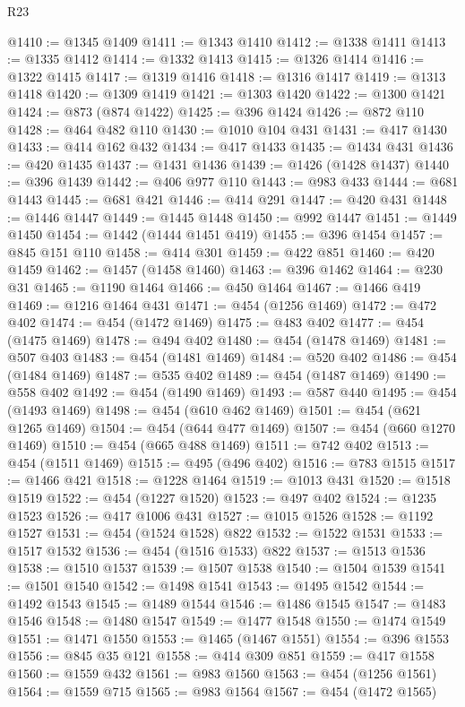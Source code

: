 \begin{lexlean}{R23}
\begin{coremodule}
@1410 := @1345 @1409
@1411 := @1343 @1410
@1412 := @1338 @1411
@1413 := @1335 @1412
@1414 := @1332 @1413
@1415 := @1326 @1414
@1416 := @1322 @1415
@1417 := @1319 @1416
@1418 := @1316 @1417
@1419 := @1313 @1418
@1420 := @1309 @1419
@1421 := @1303 @1420
@1422 := @1300 @1421
@1424 := @873 (@874 @1422)
@1425 := @396 @1424
@1426 := @872 @110
@1428 := @464 @482 @110
@1430 := @1010 @104 @431
@1431 := @417 @1430
@1433 := @414 @162 @432
@1434 := @417 @1433
@1435 := @1434 @431
@1436 := @420 @1435
@1437 := @1431 @1436
@1439 := @1426 (@1428 @1437)
@1440 := @396 @1439
@1442 := @406 @977 @110
@1443 := @983 @433
@1444 := @681 @1443
@1445 := @681 @421
@1446 := @414 @291
@1447 := @420 @431
@1448 := @1446 @1447
@1449 := @1445 @1448
@1450 := @992 @1447
@1451 := @1449 @1450
@1454 := @1442 (@1444 @1451 @419)
@1455 := @396 @1454
@1457 := @845 @151 @110
@1458 := @414 @301
@1459 := @422 @851
@1460 := @420 @1459
@1462 := @1457 (@1458 @1460)
@1463 := @396 @1462
@1464 := @230 @31
@1465 := @1190 @1464
@1466 := @450 @1464
@1467 := @1466 @419
@1469 := @1216 @1464 @431
@1471 := @454 (@1256 @1469)
@1472 := @472 @402
@1474 := @454 (@1472 @1469)
@1475 := @483 @402
@1477 := @454 (@1475 @1469)
@1478 := @494 @402
@1480 := @454 (@1478 @1469)
@1481 := @507 @403
@1483 := @454 (@1481 @1469)
@1484 := @520 @402
@1486 := @454 (@1484 @1469)
@1487 := @535 @402
@1489 := @454 (@1487 @1469)
@1490 := @558 @402
@1492 := @454 (@1490 @1469)
@1493 := @587 @440
@1495 := @454 (@1493 @1469)
@1498 := @454 (@610 @462 @1469)
@1501 := @454 (@621 @1265 @1469)
@1504 := @454 (@644 @477 @1469)
@1507 := @454 (@660 @1270 @1469)
@1510 := @454 (@665 @488 @1469)
@1511 := @742 @402
@1513 := @454 (@1511 @1469)
@1515 := @495 (@496 @402)
@1516 := @783 @1515
@1517 := @1466 @421
@1518 := @1228 @1464
@1519 := @1013 @431
@1520 := @1518 @1519
@1522 := @454 (@1227 @1520)
@1523 := @497 @402
@1524 := @1235 @1523
@1526 := @417 @1006 @431
@1527 := @1015 @1526
@1528 := @1192 @1527
@1531 := @454 (@1524 @1528) @822
@1532 := @1522 @1531
@1533 := @1517 @1532
@1536 := @454 (@1516 @1533) @822
@1537 := @1513 @1536
@1538 := @1510 @1537
@1539 := @1507 @1538
@1540 := @1504 @1539
@1541 := @1501 @1540
@1542 := @1498 @1541
@1543 := @1495 @1542
@1544 := @1492 @1543
@1545 := @1489 @1544
@1546 := @1486 @1545
@1547 := @1483 @1546
@1548 := @1480 @1547
@1549 := @1477 @1548
@1550 := @1474 @1549
@1551 := @1471 @1550
@1553 := @1465 (@1467 @1551)
@1554 := @396 @1553
@1556 := @845 @35 @121
@1558 := @414 @309 @851
@1559 := @417 @1558
@1560 := @1559 @432
@1561 := @983 @1560
@1563 := @454 (@1256 @1561)
@1564 := @1559 @715
@1565 := @983 @1564
@1567 := @454 (@1472 @1565)

\end{coremodule}
\end{lexlean}
